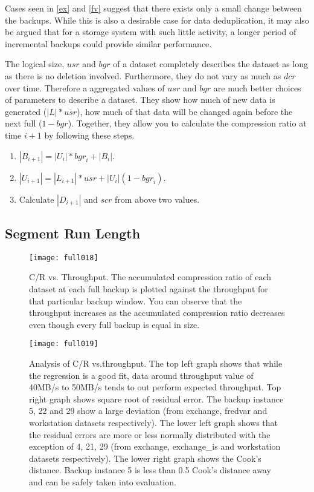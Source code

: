 Cases seen in \figurename \ref{ex} and \figurename \ref{fv} suggest that there exists only a small change between the backups. While this is also a desirable case for data deduplication, it may also be argued that for a storage system with such little activity, a longer period of incremental backups could provide similar performance. 

The logical size, $usr$ and $bgr$ of a dataset completely describes the dataset as long as there is no deletion involved. Furthermore, they do not vary as much as $dcr$ over time. Therefore a aggregated values of $usr$ and $bgr$ are much better choices of parameters to describe a dataset. They show how much of new data is generated ($|L|*\overline{\mathit{usr}}$), how much of that data will be changed again before the next full ($1-\mathit{bgr}$). Together, they allow you to calculate the compression ratio at time $i+1$ by following these steps. 
\begin{enumerate}
\item{$|B_{i+1}|=|U_{i}|*\mathit{bgr}_i+|B_i|$.}
\item{$|U_{i+1}|=|L_{i+1}|*\mathit{usr}+|U_i|(1-\mathit{bgr}_i)$.}
\item{Calculate $|D_{i+1}|$ and $\mathit{scr}$ from above two values.}
\end{enumerate}

\subsection{Segment Run Length}

\begin{figure}[!t]
\centering
\texttt{[image: full018]}
\caption{C/R vs. Throughput. The accumulated compression ratio of each dataset at each full backup is plotted against the throughput for that particular backup window. You can observe that the throughput increases as the accumulated compression ratio decreases even though every full backup is equal in size.}
\label{compthru}
\end{figure}

\begin{figure}[!t]
\centering
\texttt{[image: full019]}
\caption{Analysis of C/R vs.throughput. The top left graph shows that while the regression is a good fit, data around throughput value of 40MB/s to 50MB/s tends to out perform expected throughput. Top right graph shows square root of residual error. The backup instance 5, 22 and 29 show a large deviation (from exchange, fredvar and workstation datasets respectively). The lower left graph shows that the residual errors are more or less normally distributed with the exception of 4, 21, 29 (from exchange, exchange\_is and workstation datasets respectively). The lower right graph shows the Cook's distance. Backup instance 5 is less than 0.5 Cook's distance away and can be safely taken into evaluation.} 
\label{anal}
\end{figure}

